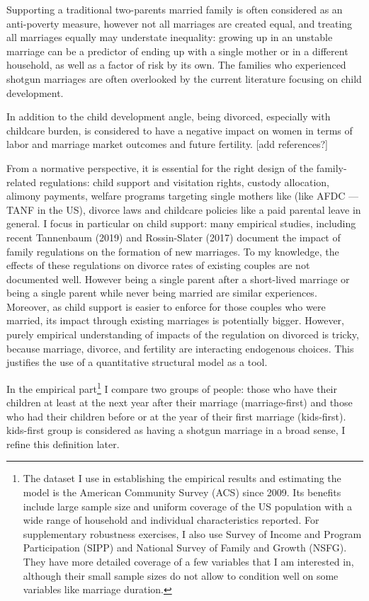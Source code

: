 \documentclass[12pt,letter]{article}
\begin{document}
Supporting a traditional two-parents married family is often considered as an anti-poverty measure, however not all marriages are created equal, and treating all marriages equally may understate inequality: growing up in an unstable marriage can be a predictor of ending up with a single mother or in a different household, as well as a factor of risk by its own. The families who experienced shotgun marriages are often overlooked by the current literature focusing on child development.

In addition to the child development angle, being divorced, especially with childcare burden, is considered to have a negative impact on women in terms of labor and marriage market outcomes and future fertility. [add references?]

From a normative perspective, it is essential for the right design of the family-related regulations: child support and visitation rights, custody allocation, alimony payments, welfare programs targeting single mothers like (like AFDC --- TANF in the US), divorce laws and childcare policies like a paid parental leave in general. I focus in particular on child support: many empirical studies, including recent Tannenbaum (2019) and Rossin-Slater (2017) document the impact of family regulations on the formation of new marriages. To my knowledge, the effects of these regulations on divorce rates of existing couples are not documented well. However being a single parent after a short-lived marriage or being a single parent while never being married are similar experiences. Moreover, as child support is easier to enforce for those couples who were married, its impact through existing marriages is potentially bigger. However, purely empirical understanding of impacts of the regulation on divorced is tricky, because marriage, divorce, and fertility are interacting endogenous choices. This justifies the use of a quantitative structural model as a tool.

In the empirical part\footnote{The dataset I use in establishing the empirical results and estimating the model is the American Community Survey (ACS) since 2009. Its benefits include large sample size and uniform coverage of the US population with a wide range of household and individual characteristics reported. For supplementary robustness exercises, I also use Survey of Income and Program Participation (SIPP) and National Survey of Family and Growth (NSFG). They have more detailed coverage of a few variables that I am interested in, although their small sample sizes do not allow to condition well on some variables like marriage duration.} I compare two groups of people: those who have their children at least at the next year after their marriage (marriage-first) and those who had their children before or at the year of their first marriage (kids-first). kids-first group is considered as having a shotgun marriage in a broad sense, I refine this definition later.
\end{document}
